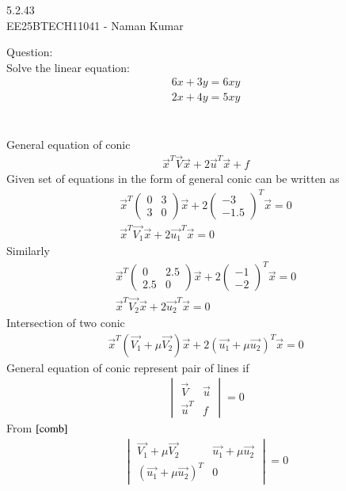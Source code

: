 \documentclass[a5paper,10pt]{article}
\author{EE25BTECH11041-Naman Kumar }
\begin{document}
\begin{center}
    \huge{5.2.43}\\
    \large{EE25BTECH11041 - Naman Kumar}
\end{center}
Question:\\
Solve the linear equation:
\begin{align}
    6x + 3y = 6xy \label{eq1}\\2x + 4y = 5xy \label{eq2}
\end{align} \\
\solution \\
General equation of conic
\begin{align}
    \vec{x}^T\vec{V}\vec{x}+2\vec{u}^T\vec{x}+f
\end{align}
Given set of equations in the form of general conic can be written as
\begin{align}
\vec{x}^T\begin{pmatrix}0&3\\3&0\end{pmatrix}\vec{x}+2\begin{pmatrix}-3\\-1.5\end{pmatrix}^T\vec{x}=0\\
\vec{x}^T\vec{V_1}\vec{x}+2\vec{u_1}^T\vec{x}=0
\end{align}
Similarly
\begin{align}
    \vec{x}^T\begin{pmatrix}0&2.5\\2.5&0\end{pmatrix}\vec{x}+2\begin{pmatrix}-1\\-2\end{pmatrix}^T\vec{x}=0\\
\vec{x}^T\vec{V_2}\vec{x}+2\vec{u_2}^T\vec{x}=0
\end{align}
Intersection of two conic
\begin{align}
    \vec{x}^T(\vec{V_1}+\mu \vec{V_2})\vec{x}+2(\vec{u_1}+\mu \vec{u_2})^T\vec{x}=0 \label{comb}
\end{align}
General equation of conic represent pair of lines if
\begin{align}
    \begin{vmatrix}\vec{V}&\vec{u}\\ \vec{u}^T&f\end{vmatrix}=0
\end{align}
From $\eqref{comb}$
\begin{align}
    \begin{vmatrix}\vec{V_1}+\mu \vec{V_2}&\vec{u_1}+\mu \vec{u_2}\\ (\vec{u_1}+\mu \vec{u_2})^T&0\end{vmatrix}=0 \label{1}
\end{align}
\end{document}
